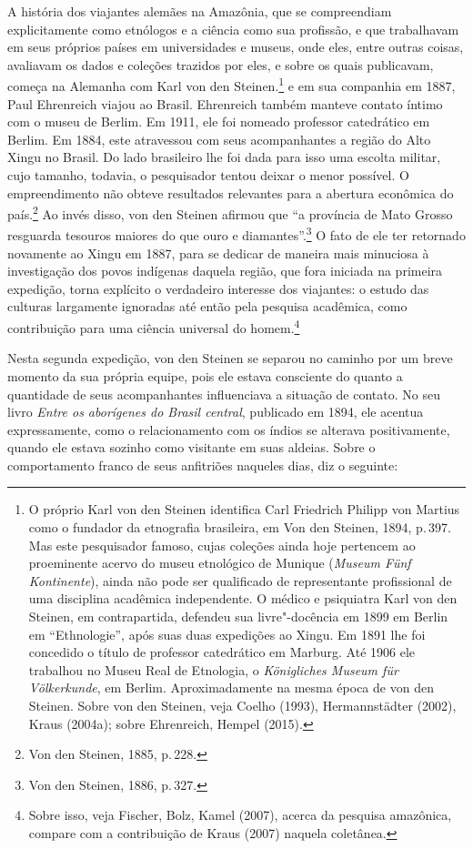 A história dos viajantes alemães na Amazônia, que se compreendiam
explicitamente como etnólogos e a ciência como sua profissão, e que
trabalhavam em seus próprios países em universidades e museus, onde
eles, entre outras coisas, avaliavam os dados e coleções trazidos por
eles, e sobre os quais publicavam, começa na Alemanha com Karl von den
Steinen.\footnote{O próprio Karl von den Steinen identifica
  Carl Friedrich Philipp von Martius como o fundador da
  etnografia brasileira, em Von den Steinen, 1894, p.\,397. Mas este
  pesquisador famoso, cujas coleções ainda hoje pertencem ao proeminente
  acervo do museu etnológico de Munique (\textit{Museum Fünf Kontinente}),
  ainda não pode ser qualificado de representante profissional de uma
  disciplina acadêmica independente. O médico e psiquiatra Karl von den
  Steinen, em contrapartida, defendeu sua livre"-docência em 1899 em
  Berlin em ``Ethnologie'', após suas duas expedições ao Xingu. Em 1891
  lhe foi concedido o título de professor catedrático em Marburg. Até
  1906 ele trabalhou no Museu Real de Etnologia, o \textit{Königliches
  Museum für Völkerkunde}, em Berlim. Aproximadamente na mesma época de
  von den Steinen. Sobre von den Steinen, veja Coelho (1993), Hermannstädter
  (2002), Kraus (2004a); sobre Ehrenreich, Hempel (2015).} e em sua companhia em 1887, Paul Ehrenreich
 viajou ao Brasil. Ehrenreich também manteve contato íntimo
  com o museu de Berlim. Em 1911, ele foi nomeado professor catedrático
  em Berlim. Em 1884, este
atravessou com seus acompanhantes a região do Alto Xingu no Brasil. Do
lado brasileiro lhe foi dada para isso uma escolta militar, cujo
tamanho, todavia, o pesquisador tentou deixar o menor possível. O
empreendimento não obteve resultados relevantes para a abertura
econômica do país.\footnote{Von den Steinen, 1885, p.\,228.} Ao invés disso, von
den Steinen afirmou que ``a província de Mato Grosso resguarda tesouros
maiores do que ouro e diamantes''.\footnote{Von den Steinen, 1886, p.\,327.} O
fato de ele ter retornado novamente ao Xingu em 1887, para se dedicar de
maneira mais minuciosa à investigação dos povos indígenas daquela
região, que fora iniciada na primeira expedição, torna explícito o
verdadeiro interesse dos viajantes: o estudo das culturas largamente
ignoradas até então pela pesquisa acadêmica, como contribuição para uma
ciência universal do homem.\footnote{Sobre isso, veja Fischer, Bolz,
  Kamel (2007), acerca da pesquisa amazônica, compare com a
  contribuição de Kraus (2007) naquela coletânea.}

Nesta segunda expedição, von den Steinen se separou no caminho por um
breve momento da sua própria equipe, pois ele estava consciente do
quanto a quantidade de seus acompanhantes influenciava a situação de
contato. No seu livro \textit{Entre os aborígenes do Brasil central}, publicado em 1894, ele
acentua expressamente, como o relacionamento com os índios se alterava
positivamente, quando ele estava sozinho como visitante em suas aldeias.
Sobre o comportamento franco de seus anfitriões naqueles dias, diz o
seguinte: 

